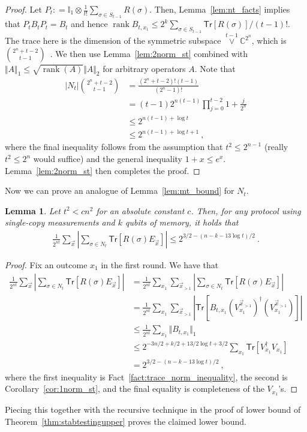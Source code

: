 \documentclass[11pt]{article}
\newtheorem{lemma}[theorem]{Lemma}
\newcommand{\id}{\ensuremath{\mathbb{I}}}
\newcommand{\Tr}{\mathsf{Tr}}
\DeclareMathOperator{\rank}{rank}
\begin{document}
    \begin{proof}
        Let $P_t : = \id_1 \otimes \frac{1}{t!}\sum_{\sigma \in S_{t-1}}R(\sigma)$. Then, Lemma~\ref{lem:nt_facts} implies that $P_t B_t P_t = B_t$ and hence $\rank B_{t,x_1} \leq 2^k \sum_{\sigma \in S_{t-1}}\Tr[R(\sigma)]/(t-1)!$. The trace here is the dimension of the symmetric subspace $\overset{t-1}{\vee}\mathbb{C}^{2^n}$, which is $\binom{2^n+t-2}{t-1}$~\cite{harrow2013church}. We then use Lemma~\ref{lem:2norm_st} combined with $\Vert A\Vert_1 \leq \sqrt{\rank(A)} \Vert A\Vert_2$ for arbitrary operators $A$. Note that 
        \begin{align}
            \vert N_t \vert \binom{2^n+t-2}{t-1} & = \frac{(2^n+t-2)! (t-1)}{(2^n-1)!}\\
            & = (t-1) 2^{n(t-1)}\prod_{j=0}^{t-2}1+\frac{j}{2^n}\\
            & \leq 2^{n(t-1)+\log t} \\
            & \leq 2^{n(t-1)+\log t + 1}\ ,
        \end{align}
        where the final inequality follows from the assumption that $t^2 \leq 2^{n-1}$ (really $t^2 \leq 2^n$ would suffice) and the general inequality $1+x \leq e^x$. Lemma~\ref{lem:2norm_st} then completes the proof.
    \end{proof}

    Now we can prove an analogue of Lemma~\ref{lem:mt_bound} for $N_t$.

    \begin{lemma}\label{lem:nt_bound}
        Let $t^2 < cn^2$ for an absolute constant $c$. Then, for any protocol using single-copy measurements and $k$ qubits of memory, it holds that
        \begin{align}
            \frac{1}{2^{nt}}\sum_{\vec{x}} \left\vert \sum_{\sigma \in N_t} \Tr[R(\sigma) E_{\vec{x}}]\right\vert \leq 2^{3/2-(n-k-13\log t)/2}\ .
        \end{align}
    \end{lemma}
    \begin{proof}
        Fix an outcome $x_1$ in the first round. We have that
        \begin{align}
            \frac{1}{2^{nt}} \sum_{\vec{x}} \left\vert \sum_{\sigma \in N_t} \Tr[R(\sigma) E_{\vec{x}}]\right\vert & = \frac{1}{2^{nt}}\sum_{x_1} \sum_{\vec{x}_{>1}} \left\vert \sum_{\sigma \in N_t} \Tr[R(\sigma) E_{\vec{x}}]\right\vert\\
            & = \frac{1}{2^{nt}}\sum_{x_1} \sum_{\vec{x}_{>1}} \left\vert \Tr[B_{t,x_1} \left( V_{x_1}^{\vec{x}_{>1}} \right)^\dagger\left( V_{x_1}^{\vec{x}_{>1}} \right)] \right\vert\\
            & \leq \frac{1}{2^{nt}}\sum_{x_1} \Vert B_{t,x_1}\Vert_1\\
            & \leq 2^{-3n/2+k/2+13/2\log t+3/2} \sum_{x_1}\Tr[V_{x_1}^\dagger V_{x_1}]\\
            & = 2^{3/2-(n-k-13\log t)/2}\ ,
        \end{align}
        where the first inequality is Fact~\ref{fact:trace_norm_inequality}, the second is Corollary~\ref{cor:1norm_st}, and the final equality is completeness of the $V_{x_1}$'s.
    \end{proof}
    
    Piecing this together with the recursive technique in the proof of lower bound of  Theorem~\ref{thm:stabtestingupper} proves the claimed lower bound.
\end{document}
